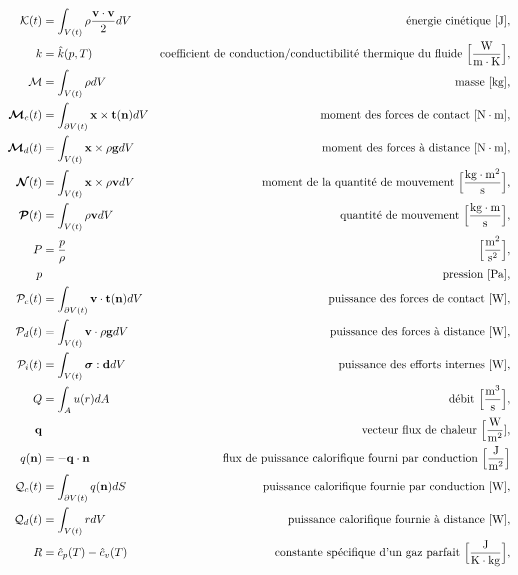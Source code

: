 \begin{align*}
      \mathcal{K}(t) &= \int_{V(t)} \rho \frac{\vb{v}\cdot\vb{v}}{2} dV & \textrm{énergie cinétique } [\si{J}],\\
      k &= \hat{k}(p,T) & \textrm{coefficient de conduction/conductibilité thermique du fluide } \Big[\si{\frac{W}{m\cdot K}} \Big],\\
      \mathcal{M} & = \int_{V(t)} \rho dV  & \textrm{masse [\si{kg}],}\\
      \bs{\mathcal{M}}_c (t) &= \int_{\partial V(t)} \vb{x} \times \vb{t}(\vb{n}) dV & \textrm{moment des forces de contact } [\si{N \cdot m}],\\
      \bs{\mathcal{M}}_d (t) &= \int_{V(t)} \vb{x} \times \rho \vb{g} dV & \textrm{moment des forces à distance } [\si{N \cdot m}],\\
      \bs{\mathcal{N}}(t) &= \int_{V(t)} \vb{x} \times \rho \vb{v} dV & \textrm{moment de la quantité de mouvement } \Big[\si{\frac{kg \cdot  m^2}{s}}\Big],\\
      \bs{\mathcal{P}}(t) &= \int_{V(t)} \rho \vb{v} dV & \textrm{quantité de mouvement } \Big[\si{\frac{kg \cdot m}{s}}\Big],\\
      P &= \frac{p}{\rho} & \Big[\si{\frac{m^2}{s^2}}\Big],\\
      p & & \textrm{pression } [\si{Pa}],\\
      \mathcal{P}_c(t) &= \int_{\partial V(t)} \vb{v} \cdot \vb{t}(\vb{n}) dV & \textrm{puissance des forces de contact } [\si{W}], \\
      \mathcal{P}_d(t) &= \int_{V(t)} \vb{v} \cdot \rho \vb{g} dV & \textrm{puissance des forces à distance } [\si{W}], \\
      \mathcal{P}_i(t) &= \int_{V(t)} \bs{\sigma} : \vb{d} dV & \textrm{puissance des efforts internes } [\si{W}],\\
      Q &= \int_A u(r) dA & \textrm{débit } \Big[\si{\frac{m^3}{s}}\Big],\\
      \vb{q} & & \textrm{vecteur flux de chaleur } \Big[\si{\frac{W}{m^2}}], \\
      q(\vb{n}) &= - \vb{q} \cdot \vb{n} & \textrm{flux de puissance calorifique fourni par conduction } \Big[\si{\frac{J}{m^2}}\Big]\\
      \mathcal{Q}_c(t) &= \int_{\partial V(t)} q(\vb{n}) dS & \textrm{puissance calorifique fournie par conduction } [\si{W}], \\
      \mathcal{Q}_d(t) &= \int_{V(t)} r dV & \textrm{puissance calorifique fournie à distance } [\si{W}], \\
      R &= \hat{c}_p(T) - \hat{c}_v(T) & \textrm{constante spécifique d'un gaz parfait } \Big[\si{\frac{J}{K \cdot kg}}\Big],\\

\end{align*}
